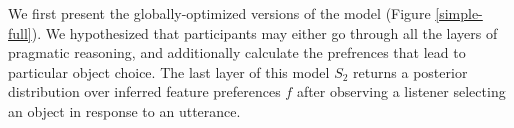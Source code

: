 \documentclass[10pt,a4paper]{article}
\begin{document}

We first present the globally-optimized versions of the model (Figure \ref{simple-full}). We hypothesized that participants may either go through all the layers of pragmatic reasoning, and additionally calculate the prefrences that lead to particular object choice. The last layer of this model $S_2$  returns a posterior distribution over inferred feature preferences $f$ after observing a listener selecting an object in response to an utterance. 
\end{document}
